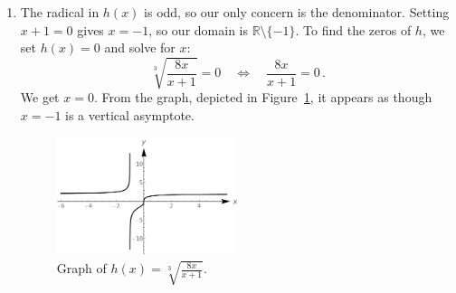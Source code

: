 \begin{example}
\begin{enumerate}
\ifvc
\item  The radical in $h(x)$ is odd, so our only concern is the denominator.  Setting $x+1=0$ gives $x=-1$, so our domain is $\mathbb{R}\setminus\{-1\}$.  To find the zeros of $h$, we set $h(x) = 0$ and solve for $x$:
$$
\sqrt[3]{\frac{8x}{x+1}} = 0\quad\Leftrightarrow\quad\frac{8x}{x+1} = 0\,.
$$
  We get $x=0$. From the graph, depicted in Figure~\ref{fig_algebraic_17}, it appears as though $x=-1$ is a vertical asymptote.
\begin{figure}[H]
    \begin{center}
			\includegraphics[width=0.5\textwidth]{fig_algebraic_17}
	\end{center}
    \caption{Graph of $h(x) = \sqrt[3]{\frac{8x}{x+1}}$.}
    \label{fig_algebraic_17}
\end{figure}
\fi 

\end{enumerate}
\end{example}
\fi

